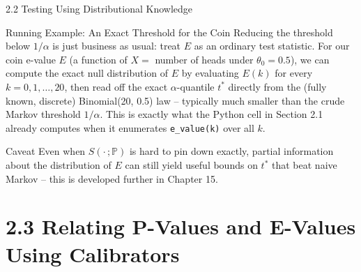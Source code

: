 \documentclass[aspectratio=169,10pt]{beamer}
\newcommand{\PP}{\mathbb{P}}
\begin{document}
\begin{frame}[allowframebreaks]{2.2 Testing Using Distributional Knowledge}
  \framebreak

  \begin{exampleblock}{Running Example: An Exact Threshold for the Coin}
    Reducing the threshold below $1/\alpha$ is just business as usual: treat
    $E$ as an ordinary test statistic. For our coin e-value $E$ (a function
    of $X=$ number of heads under $\theta_0=0.5$), we can compute the exact
    null distribution of $E$ by evaluating $E(k)$ for every
    $k=0,1,\ldots,20$, then read off the exact $\alpha$-quantile $t^{*}$
    directly from the (fully known, discrete) Binomial(20, 0.5) law --
    typically much smaller than the crude Markov threshold $1/\alpha$.
    This is exactly what the Python cell in Section 2.1 already computes
    when it enumerates \texttt{e\_value(k)} over all $k$.
  \end{exampleblock}

  \begin{alertblock}{Caveat}
    Even when $S(\cdot\,;\PP)$ is hard to pin down exactly, partial
    information about the distribution of $E$ can still yield useful bounds
    on $t^{*}$ that beat naive Markov -- this is developed further in
    Chapter 15.
  \end{alertblock}

\end{frame}

\section{2.3 Relating P-Values and E-Values Using Calibrators}
\end{document}
